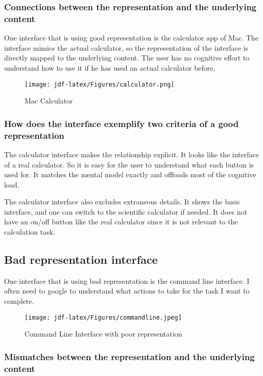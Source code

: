 \documentclass[
	letterpaper, %
]{jdf}
\begin{document}
\subsubsection{Connections between the representation and the underlying content}
One interface that is using good representation is the calculator app of Mac. The interface mimics the actual calculator, so the representation of the interface is directly mapped to the underlying content. The user has no cognitive effort to understand how to use it if he has used an actual calculator before. 

\begin{figure}[h]
	\centering
	\texttt{[image: jdf-latex/Figures/calculator.png]}
	\caption{Mac Calculator}
	\label{fig:calculator}
\end{figure}

\subsubsection{How does the interface exemplify two criteria of a good representation}

The calculator interface makes the relationship explicit. It looks like the interface of a real calculator. So it is easy for the user to understand what each button is used for. It matches the mental model exactly and offloads most of the cognitive load.

The calculator interface also excludes extraneous details. It shows the basic interface, and one can switch to the scientific calculator if needed. It does not have an on/off button like the real calculator since it is not relevant to the calculation task.

\subsection{Bad representation interface}
One interface that is using bad representation is the command line interface. I often need to google to understand what actions to take for the task I want to complete.
\begin{figure}[h]
	\centering
	\texttt{[image: jdf-latex/Figures/commandline.jpeg]}
	\caption{Command Line Interface with poor representation}
	\label{fig:commandline}
\end{figure}
\subsubsection{Mismatches between the representation and the underlying content}
\end{document}
